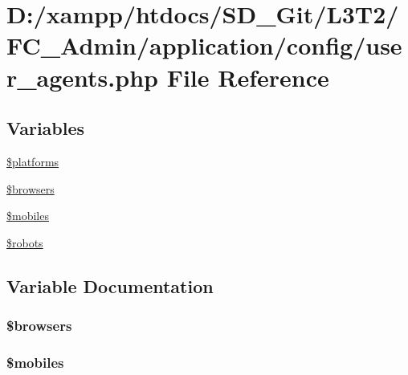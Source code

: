 \hypertarget{user__agents_8php}{}\section{D\+:/xampp/htdocs/\+S\+D\+\_\+\+Git/\+L3\+T2/\+F\+C\+\_\+\+Admin/application/config/user\+\_\+agents.php File Reference}
\label{user__agents_8php}
\subsection*{Variables}
\begin{DoxyCompactItemize}
\item 
\hyperlink{user__agents_8php_a1c1a0a860242698ee6b3f4ef7d6eb343}{\$platforms}
\item 
\hyperlink{user__agents_8php_a81edf933083b5ac5b380385f59074a7d}{\$browsers}
\item 
\hyperlink{user__agents_8php_a6928dde5aa0be443766d5b2376de908a}{\$mobiles}
\item 
\hyperlink{user__agents_8php_a5752e2a66d1c03bc34666492746037ab}{\$robots}
\end{DoxyCompactItemize}


\subsection{Variable Documentation}
\hypertarget{user__agents_8php_a81edf933083b5ac5b380385f59074a7d}{}
\subsubsection[{\$browsers}]{\setlength{\rightskip}{0pt plus 5cm}\$browsers}\label{user__agents_8php_a81edf933083b5ac5b380385f59074a7d}
\hypertarget{user__agents_8php_a6928dde5aa0be443766d5b2376de908a}{}
\subsubsection[{\$mobiles}]{\setlength{\rightskip}{0pt plus 5cm}\$mobiles}\label{user__agents_8php_a6928dde5aa0be443766d5b2376de908a}
\hypertarget{user__agents_8php_a1c1a0a860242698ee6b3f4ef7d6eb343}{}
